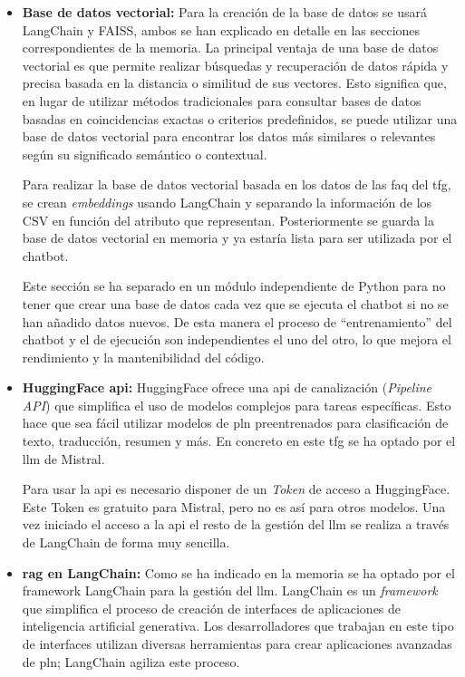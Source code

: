 \begin{itemize}
    \item \textbf{Base de datos vectorial:} Para la creación de la base de datos se usará LangChain y FAISS, ambos se han explicado en detalle en las secciones correspondientes de la memoria. La principal ventaja de una base de datos vectorial es que permite realizar búsquedas y recuperación de datos rápida y precisa basada en la distancia o similitud de sus vectores. Esto significa que, en lugar de utilizar métodos tradicionales para consultar bases de datos basadas en coincidencias exactas o criterios predefinidos, se puede utilizar una base de datos vectorial para encontrar los datos más similares o relevantes según su significado semántico o contextual.

    Para realizar la base de datos vectorial basada en los datos de las \acrshort{faq} del \acrlong{tfg}, se crean \textit{embeddings} usando LangChain y separando la información de los CSV en función del atributo que representan. Posteriormente se guarda la base de datos vectorial en memoria y ya estaría lista para ser utilizada por el chatbot.

    Este sección se ha separado en un módulo independiente de Python para no tener que crear una base de datos cada vez que se ejecuta el chatbot si no se han añadido datos nuevos. De esta manera el proceso de ``entrenamiento'' del chatbot y el de ejecución son independientes el uno del otro, lo que mejora el rendimiento y la mantenibilidad del código.

    \item \textbf{HuggingFace \acrshort{api}:} HuggingFace ofrece una \acrshort{api} de canalización (\textit{Pipeline API}) que simplifica el uso de modelos complejos para tareas específicas. Esto hace que sea fácil utilizar modelos de \acrshort{pln} preentrenados para clasificación de texto, traducción, resumen y más. En concreto en este \acrshort{tfg} se ha optado por el \acrshort{llm} de Mistral.

    Para usar la \acrshort{api} es necesario disponer de un \textit{Token} de acceso a HuggingFace. Este Token es gratuito para Mistral, pero no es así para otros modelos. Una vez iniciado el acceso a la \acrshort{api} el resto de la gestión del \acrshort{llm} se realiza a través de LangChain de forma muy sencilla.

    \item \textbf{\acrshort{rag} en LangChain:} Como se ha indicado en la memoria se ha optado por el framework LangChain para la gestión del \acrshort{llm}. LangChain es un \textit{framework} que simplifica el proceso de creación de interfaces de aplicaciones de inteligencia artificial generativa. Los desarrolladores que trabajan en este tipo de interfaces utilizan diversas herramientas para crear aplicaciones avanzadas de \acrshort{pln}; LangChain agiliza este proceso.


\end{itemize}
